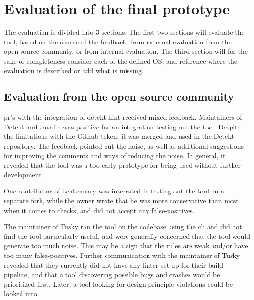 \documentclass{report}
\begin{document}
\section{Evaluation of the final prototype}
The evaluation is divided into 3 sections. The first two sections will evaluate the tool, based on the source of the feedback, from external evaluation from the open-source communty, or from internal evaluation. The third section will for the sake of completeness consider each of the defined OS, and reference where the evaluation is described or add what is missing. 

\subsection{Evaluation from the open source community}
\label{evaluation-open-source}

\gls{pr}'s with the integration of detekt-hint received mixed feedback. Maintainers of Detekt and Javalin was positive for an integration testing out the tool. Despite the limitations with the Github token, it was merged and used in the Detekt repository. The feedback pointed out the noise, as well as additional suggestions for improving the comments and ways of reducing the noise. In general, it revealed that the tool was a too early prototype for being used without further development.

One contributor of Leakcanary was interested in testing out the tool on a separate fork, while the owner wrote that he was more conservative than most when it comes to checks, and did not accept any false-positives. 

The maintainer of Tusky\cite{tusky} ran the tool on the codebase using the \gls{cli} and did not find the tool particularly useful, and were generally concerned that the tool would generate too much noise. This may be a sign that the rules are weak and/or have too many false-positives. Further communication with the maintainer of Tusky revealed that they currently did not have any linter set up for their build pipeline, and that a tool discovering possible bugs and crashes would be prioritized first. Later, a tool looking for design principle violations could be looked into.
\end{document}
